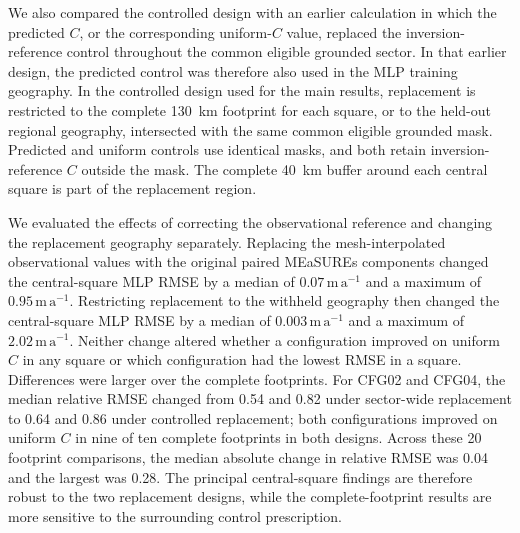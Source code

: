 \documentclass[review,jog]{igs}
\begin{document}
We also compared the controlled design with an earlier calculation in which
the predicted $C$, or the corresponding uniform-$C$ value, replaced the
inversion-reference control throughout the common eligible grounded sector.
In that earlier design, the predicted control was therefore also used in the
MLP training geography. In the controlled design used for the main results,
replacement is restricted to the complete 130~km footprint for each square,
or to the held-out regional geography, intersected with the same common
eligible grounded mask. Predicted and uniform controls use identical masks,
and both retain inversion-reference $C$ outside the mask. The complete 40~km
buffer around each central square is part of the replacement region.

We evaluated the effects of correcting the observational reference and changing the replacement geography separately. Replacing the
mesh-interpolated observational values with the original paired MEaSUREs
components changed the central-square MLP RMSE by a median of
$0.07\,\mathrm{m\,a^{-1}}$ and a maximum of
$0.95\,\mathrm{m\,a^{-1}}$. Restricting replacement to the withheld
geography then changed the central-square MLP RMSE by a median of
$0.003\,\mathrm{m\,a^{-1}}$ and a maximum of
$2.02\,\mathrm{m\,a^{-1}}$. Neither change altered whether a configuration
improved on uniform $C$ in any square or which configuration had the lowest
RMSE in a square. Differences were larger over the complete footprints. For
CFG02 and CFG04, the median relative RMSE changed from 0.54 and 0.82 under
sector-wide replacement to 0.64 and 0.86 under controlled replacement; both
configurations improved on uniform $C$ in nine of ten complete footprints in
both designs. Across these 20 footprint comparisons, the median absolute
change in relative RMSE was 0.04 and the largest was 0.28. The principal
central-square findings are therefore robust to the two replacement designs,
while the complete-footprint results are more sensitive to the surrounding
control prescription.
\end{document}
